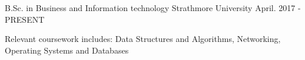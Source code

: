 \begin{cventries}
  \cventry
    {B.Sc. in Business and Information technology}
    {Strathmore University}
    {}
    {April. 2017 - PRESENT}
    {
      \begin{cvitems}
        \item {Relevant coursework includes: Data Structures and Algorithms, Networking, Operating Systems and Databases}
      \end{cvitems}
    }
\end{cventries}

